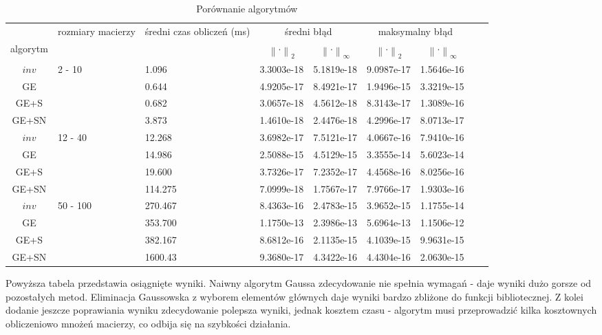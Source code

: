 \documentclass{article}
\newcommand{\norm}[1]{\left\lVert#1\right\rVert}
\begin{document}
\begin{table}[h]
\begin{tabular}{c|p{1.5cm}|p{2.5cm}|c|c|c|c|c|c}
 &\multirow{2}{1.5cm}{rozmiary macierzy} & \multirow{2}{2.5cm}{średni czas obliczeń (ms)} & \multicolumn{2}{c}{średni błąd} & \multicolumn{2}{c}{maksymalny błąd} \\ algorytm &  &  &  $\norm{\cdot}_2$ &  $\norm{\cdot}_{\infty}$ & $\norm{\cdot}_2$ &  $\norm{\cdot}_{\infty}$ \\ \hline
$inv$ & \multirow{4}{*}{2 - 10} & 1.096 & 3.3003e-18 & 5.1819e-18 & 9.0987e-17 & 1.5646e-16 \\
GE & & 0.644 &  4.9205e-17 & 8.4921e-17 &  1.9496e-15 & 3.3219e-15 \\
GE+S && 0.682 & 3.0657e-18 & 4.5612e-18 &  8.3143e-17 & 1.3089e-16 \\
GE+SN && 3.873 & 1.4610e-18 & 2.4476e-18 & 4.2996e-17 & 8.0713e-17 \\ \hline
$inv$ & \multirow{4}{*}{12 - 40} & 12.268 & 3.6982e-17 & 7.5121e-17 &  4.0667e-16 & 7.9410e-16 \\
GE && 14.986 & 2.5088e-15 & 4.5129e-15 & 3.3555e-14 & 5.6023e-14 \\
GE+S && 19.600 & 3.7326e-17 & 7.2352e-17 & 4.4568e-16 & 8.0256e-16 \\
GE+SN && 114.275 & 7.0999e-18 & 1.7567e-17 & 7.9766e-17 & 1.9303e-16 \\ \hline
$inv$ & \multirow{4}{*}{50 - 100} & 270.467 & 8.4363e-16 & 2.4783e-15 & 3.9652e-15 & 1.1755e-14 \\
GE && 353.700 & 1.1750e-13 & 2.3986e-13 & 5.6964e-13 & 1.1506e-12 \\
GE+S && 382.167 & 8.6812e-16 & 2.1135e-15 & 4.1039e-15 & 9.9631e-15 \\
GE+SN && 1600.43 & 9.3680e-17 & 4.3422e-16 & 4.4304e-16 & 2.0630e-15 \\
\hline
\end{tabular}
\caption{Porównanie algorytmów}
\end{table}

Powyższa tabela przedstawia osiągnięte wyniki. Naiwny algorytm Gaussa zdecydowanie nie spełnia wymagań - daje wyniki dużo gorsze od pozostałych metod. Eliminacja Gaussowska z wyborem elementów głównych daje wyniki bardzo zbliżone do funkcji bibliotecznej. Z kolei dodanie jeszcze poprawiania wyniku zdecydowanie polepsza wyniki, jednak kosztem czasu - algorytm musi przeprowadzić kilka kosztownych obliczeniowo mnożeń macierzy, co odbija się na szybkości działania.


\end{document}
